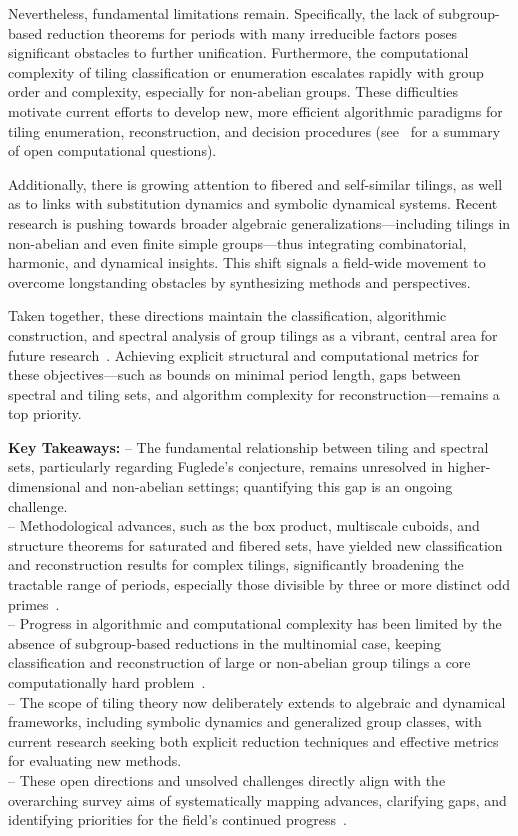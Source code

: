 \documentclass[sigconf]{acmart}
\begin{document}
Nevertheless, fundamental limitations remain. Specifically, the lack of subgroup-based reduction theorems for periods with many irreducible factors poses significant obstacles to further unification. Furthermore, the computational complexity of tiling classification or enumeration escalates rapidly with group order and complexity, especially for non-abelian groups. These difficulties motivate current efforts to develop new, more efficient algorithmic paradigms for tiling enumeration, reconstruction, and decision procedures (see~\cite{ref101} for a summary of open computational questions).

Additionally, there is growing attention to fibered and self-similar tilings, as well as to links with substitution dynamics and symbolic dynamical systems. Recent research is pushing towards broader algebraic generalizations—including tilings in non-abelian and even finite simple groups—thus integrating combinatorial, harmonic, and dynamical insights. This shift signals a field-wide movement to overcome longstanding obstacles by synthesizing methods and perspectives.

Taken together, these directions maintain the classification, algorithmic construction, and spectral analysis of group tilings as a vibrant, central area for future research~\cite{ref101}. Achieving explicit structural and computational metrics for these objectives—such as bounds on minimal period length, gaps between spectral and tiling sets, and algorithm complexity for reconstruction—remains a top priority.

\vspace{0.5em}
\noindent
\textbf{Key Takeaways:}
\newline
-- The fundamental relationship between tiling and spectral sets, particularly regarding Fuglede's conjecture, remains unresolved in higher-dimensional and non-abelian settings; quantifying this gap is an ongoing challenge.\\
-- Methodological advances, such as the box product, multiscale cuboids, and structure theorems for saturated and fibered sets, have yielded new classification and reconstruction results for complex tilings, significantly broadening the tractable range of periods, especially those divisible by three or more distinct odd primes~\cite{ref101}.\\
-- Progress in algorithmic and computational complexity has been limited by the absence of subgroup-based reductions in the multinomial case, keeping classification and reconstruction of large or non-abelian group tilings a core computationally hard problem~\cite{ref101}.\\
-- The scope of tiling theory now deliberately extends to algebraic and dynamical frameworks, including symbolic dynamics and generalized group classes, with current research seeking both explicit reduction techniques and effective metrics for evaluating new methods.\\
-- These open directions and unsolved challenges directly align with the overarching survey aims of systematically mapping advances, clarifying gaps, and identifying priorities for the field’s continued progress~\cite{ref101}.
\end{document}

